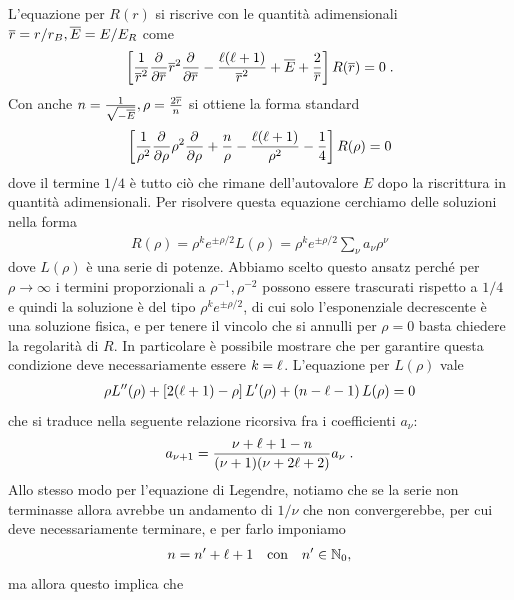 L'equazione per $ R(r) $ si riscrive con 
le quantità adimensionali $ \overline{r} = r /r_B, \overline{E} = E/E_R $ come
\begin{align*}
  \left[ \frac{1}{\overline{r}^2} \frac{\partial^{} {}}{\partial { \overline{r} }^{}} \overline{r}^2 \frac{\partial^{} {}}{\partial { \overline{r} }^{}} 
  - \frac{\ell (\ell + 1)}{\overline{r}^2} + \overline{E} + \frac{2}{\overline{r}} \right] R(\overline{r}) = 0\;.
\end{align*}
Con anche $ n = \frac1{\sqrt{-\overline{E}}}, \rho = \frac{2\overline{r}}{n} $ si ottiene la forma standard 
\begin{align*}
  \left[ \frac{1}{\rho^2} \frac{\partial^{} {}}{\partial {\rho}^{}} \rho^2 \frac{\partial^{} {}}{\partial {\rho}^{}}
  + \frac{n}\rho - \frac{\ell (\ell + 1)}{\rho^2}  - \frac14 \right] R(\rho) = 0
\end{align*}
dove il termine $ 1/4 $ è tutto ciò che rimane dell'autovalore $ E $ dopo la riscrittura in quantità adimensionali.
Per risolvere questa equazione cerchiamo delle soluzioni nella forma 
\begin{align*}
  R(\rho) = \rho^k e^{\pm \rho /2} L(\rho)  = \rho^k e^{\pm \rho /2} \sum_{\nu} a_\nu \rho^\nu
\end{align*}
dove $ L(\rho) $ è una serie di potenze. Abbiamo scelto questo ansatz perché per $ \rho \to \infty $ i termini proporzionali a $ \rho^{-1}, \rho^{-2} $ 
possono essere trascurati rispetto a $ 1/4 $ e quindi la soluzione è del tipo $ \rho^k e^{\pm\rho/2} $, di cui solo l'esponenziale decrescente è una 
soluzione fisica, e per tenere il vincolo che si annulli per $ \rho = 0 $ basta chiedere la regolarità di $ R $. In particolare è possibile 
mostrare che per garantire questa condizione deve necessariamente essere $ k = \ell $. L'equazione per $ L(\rho) $ vale 
\begin{align} \label{eq: equazione per le autofunzioni L dell'atomo di idrogeno}
  \rho L''(\rho) + \left[ 2(\ell + 1) - \rho \right] L'(\rho) + \left( n - \ell -1 \right) L(\rho) = 0
\end{align}
che si traduce nella seguente relazione ricorsiva fra i coefficienti $ a_\nu $:
\begin{align*}
  a_{\nu + 1} = \frac{\nu + \ell + 1 - n}{(\nu + 1) (\nu + 2 \ell + 2)} a_\nu \;.
\end{align*}
Allo stesso modo per l'equazione di Legendre, notiamo che se la serie non terminasse allora avrebbe un andamento di $ 1/\nu $ che non convergerebbe, 
per cui deve necessariamente terminare, e per farlo imponiamo 
\begin{align*}
  n = n' + \ell + 1 \quad \text{con} \quad n' \in \mathbb{N}_0,
\end{align*}
ma allora questo implica che 
